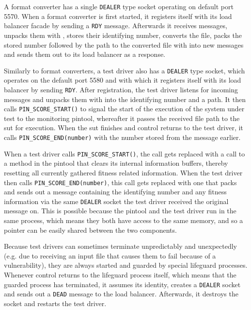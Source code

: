 A format converter has a single \texttt{DEALER} type socket operating on default port 5570.
When a format converter is first started, it registers itself with its load balancer facade by sending a
\texttt{RDY} message. Afterwards it receives \zmq messages, unpacks them with \msgpack, stores their
identifying number, converts the file, packs the stored number followed by the path to the converted file with
\msgpack into new \zmq messages and sends them out to its load balancer as a response.

Similarly to format converters, a test driver also has a \texttt{DEALER} type socket, which operates on the
default port 5580 and with which it registers itself with its load balancer by sending \texttt{RDY}. After
registration, the test driver listens for incoming \zmq messages and unpacks them with \msgpack
into the identifying number and a path. It then calls \texttt{PIN\_SCORE\_START()} to signal the start of the
execution of the system under test to the monitoring pintool, whereafter it passes the received file path to
the sut for execution. When the sut finishes and control returns to the test driver, it calls
\texttt{PIN\_SCORE\_END(number)} with the number stored from the message earlier.

When a test driver calls \texttt{PIN\_SCORE\_START()}, the call gets replaced with a call to a method in the 
pintool that clears its internal information buffers, thereby resetting all currently gathered fitness related 
information. When the test driver then calls \texttt{PIN\_SCORE\_END(number)}, this call gets replaced with 
one that packs and sends out a message containing the identifying number and any fitness information via
the same \zmq \texttt{DEALER} socket the test driver received the original message on. This is possible
because the pintool and the test driver run in the same process, which means they both have access to the same
memory, and so a pointer can be easily shared between the two components.

Because test drivers can sometimes terminate unpredictably and unexpectedly (e.g. due to receiving an input
file that causes them to fail because of a vulnerability), they are always started and guarded by special
lifeguard processes. Whenever control returns to the lifeguard process itself, which means that the guarded
process has terminated, it assumes its identity, creates a \texttt{DEALER} socket and sends out a \texttt{DEAD}
message to the load balancer. Afterwards, it destroys the socket and restarts the test driver.

